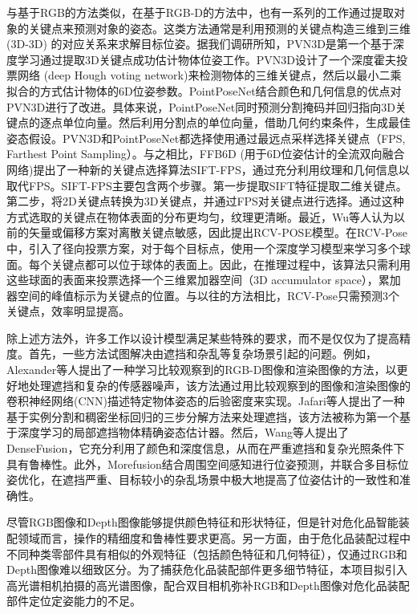 \documentclass[12pt]{article}
\begin{document}
与基于RGB的方法类似，在基于RGB-D的方法中，也有一系列的工作通过提取对象的关键点来预测对象的姿态。这类方法通常是利用预测的关键点构造三维到三维 (3D-3D) 的对应关系来求解目标位姿。据我们调研所知，PVN3D\cite{he2020pvn3d54}是第一个基于深度学习通过提取3D关键点成功估计物体位姿工作。PVN3D设计了一个深度霍夫投票网络 (deep Hough voting network)来检测物体的三维关键点，然后以最小二乘拟合的方式估计物体的6D位姿参数。PointPoseNet\cite{chen2020pointposenet55}结合颜色和几何信息的优点对PVN3D进行了改进。具体来说，PointPoseNet同时预测分割掩码并回归指向3D关键点的逐点单位向量。然后利用分割点的单位向量，借助几何约束条件，生成最佳姿态假设。PVN3D和PointPoseNet都选择使用通过最远点采样选择关键点（FPS, Farthest Point Sampling）。与之相比，FFB6D (用于6D位姿估计的全流双向融合网络)\cite{he2021ffb6d56}提出了一种新的关键点选择算法SIFT-FPS，通过充分利用纹理和几何信息以取代FPS。SIFT-FPS主要包含两个步骤。第一步提取SIFT特征提取二维关键点。第二步，将2D关键点转换为3D关键点，并通过FPS对关键点进行选择。通过这种方式选取的关键点在物体表面的分布更均匀，纹理更清晰。最近，Wu等人\cite{wu2022vote57}认为以前的矢量或偏移方案对离散关键点敏感，因此提出RCV-POSE模型。在RCV-Pose中，引入了径向投票方案，对于每个目标点，使用一个深度学习模型来学习多个球面。每个关键点都可以位于球体的表面上。因此，在推理过程中，该算法只需利用这些球面的表面来投票选择一个三维累加器空间（3D accumulator space），累加器空间的峰值标示为关键点的位置。与以往的方法相比，RCV-Pose只需预测3个关键点，效率明显提高。

除上述方法外，许多工作以设计模型满足某些特殊的要求，而不是仅仅为了提高精度。首先，一些方法试图解决由遮挡和杂乱等复杂场景引起的问题。例如，Alexander等人\cite{krull2015learning58}提出了一种学习比较观察到的RGB-D图像和渲染图像的方法，以更好地处理遮挡和复杂的传感器噪声，该方法通过用比较观察到的图像和渲染图像的卷积神经网络(CNN)描述特定物体姿态的后验密度来实现。Jafari等人\cite{hosseini2019ipose59}提出了一种基于实例分割和稠密坐标回归的三步分解方法来处理遮挡，该方法被称为第一个基于深度学习的局部遮挡物体精确姿态估计器。然后，Wang等人\cite{wang2019densefusion60}提出了DenseFusion，它充分利用了颜色和深度信息，从而在严重遮挡和复杂光照条件下具有鲁棒性。此外，Morefusion\cite{wada2020morefusion61}结合周围空间感知进行位姿预测，并联合多目标位姿优化，在遮挡严重、目标较小的杂乱场景中极大地提高了位姿估计的一致性和准确性。


尽管RGB图像和Depth图像能够提供颜色特征和形状特征，但是针对危化品智能装配领域而言，操作的精细度和鲁棒性要求更高。另一方面，由于危化品装配过程中不同种类零部件具有相似的外观特征（包括颜色特征和几何特征），仅通过RGB和Depth图像难以细致区分。为了捕获危化品装配部件更多细节特征，本项目拟引入高光谱相机拍摄的高光谱图像，配合双目相机弥补RGB和Depth图像对危化品装配部件定位定姿能力的不足。
\end{document}
